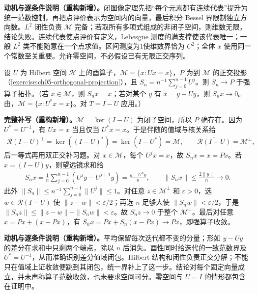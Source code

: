 \documentclass[../../main.tex]{subfiles}
\begin{document}
\begin{remark}
\textbf{动机与逐条件说明（重构新增）。}闭图像定理先把“每个元素都有连续代表”提升为统一范数控制，再把点评价表示为空间内的向量，最后积分 Bessel 界限制独立方向数。$L^2$ 闭性负责 $\mathscr M$ 完备；若取所有多项式组成的非闭子空间，则维数无限，结论失败。连续代表使点评价有定义，Lebesgue 测度的满支撑使该代表唯一；一般 $L^2$ 类不能随意在一个点求值。区间测度为1使维数界恰为 $C^2$；全体 $x$ 使用同一个常数至关重要。允许零空间，不必假设已有无限正交序列。
\end{remark}
\begin{exercise}[平均遍历定理]\label{exercise:ch05-mean-ergodic}
设 $U$ 为 Hilbert 空间 $\mathscr H$ 上的酉算子，$\mathscr M=\{x:Ux=x\}$，$P$ 为到 $\mathscr M$ 的正交投影（\cref{exercise:ch05-orthogonal-projection}），且 $S_n=n^{-1}\sum_{j=0}^{n-1}U^j$。则 $S_n\to P$ 于强算子拓扑。（若 $x\in\mathscr M$，则 $S_nx=x$；若对某个 $y$ 有 $x=y-Uy$，则 $S_nx\to0$。由，$\mathscr M=\{x:U^*x=x\}$。对 $T=I-U$ 应用。）
\end{exercise}
\begin{solution}
\textbf{完整补写（重构新增）。}$\mathscr M=\ker(I-U)$ 为闭子空间，所以 $P$ 确存在。因为 $U^*=U^{-1}$，有 $Ux=x$ 当且仅当 $U^*x=x$。于是伴随的值域与核关系给
\begin{align*}
\mathscr R(I-U)^\perp=\ker((I-U)^*)=\ker(I-U^*)=\mathscr M,
\qquad \overline{\mathscr R(I-U)}=\mathscr M^\perp,
\end{align*}
后一等式再用双正交补习题。对 $x\in\mathscr M$，每个 $U^jx=x$，故 $S_nx=x=Px$。若 $x=(I-U)y$，则望远镜求和给
\begin{align*}
S_nx=\frac1n\sum_{j=0}^{n-1}(U^jy-U^{j+1}y)
=\frac{y-U^ny}{n},\qquad
\|S_nx\|\leqslant\frac{2\|y\|}{n}\longrightarrow0.
\end{align*}
此外 $\|S_n\|\leqslant n^{-1}\sum_{j=0}^{n-1}\|U^j\|\leqslant1$。对任意 $z\in\mathscr M^\perp$ 和 $\varepsilon>0$，选 $w\in\mathscr R(I-U)$ 使 $\|z-w\|<\varepsilon/2$；再选 $n$ 足够大使 $\|S_nw\|<\varepsilon/2$，于是 $\|S_nz\|\leqslant\|z-w\|+\|S_nw\|<\varepsilon$。故 $S_nz\to0$ 于整个 $\mathscr M^\perp$。最后对任意 $x=Px+(x-Px)$，有 $S_nx=Px+S_n(x-Px)\to Px$，即强算子收敛。
\end{solution}
\begin{remark}
\textbf{动机与逐条件说明（重构新增）。}平均保留每次迭代都不变的分量；形如 $y-Uy$ 的差分在求和中只剩两个端点，除以 $n$ 后消失。酉性同时给迭代的一致范数界及 $U^*=U^{-1}$，从而准确识别差分值域闭包。Hilbert 结构和闭性负责正交分解；不能只在值域上证收敛便跳到其闭包，统一界补上了这一步。结论对每个固定向量成立，并未声称算子范数收敛，也未要求空间可分。零空间与 $U=I$ 的情形都包含在证明中。
\end{remark}
\end{document}
